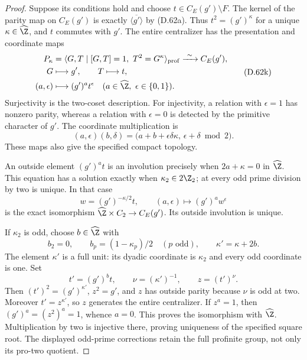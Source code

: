 \begin{proof}
Suppose its conditions hold and choose
$t\in C_E(g')\setminus F$.
The kernel of the parity map on $C_E(g')$ is exactly
$\overline{\langle g'\rangle}$ by (D.62a).
Thus $t^2=(g')^\kappa$ for a unique
$\kappa\in\widehat\Z$, and $t$ commutes with $g'$.
The entire centralizer has the presentation and
coordinate maps
\[
 \begin{split}
 P_\kappa&=
 \langle G,T\mid [G,T]=1,\ T^2=G^\kappa\rangle_{\rm prof}
          \xrightarrow{\ \sim\ } C_E(g'),\\
 G&\longmapsto g',\qquad T\longmapsto t,\\
 (a,\epsilon)&\longmapsto (g')^a t^\epsilon
       \quad(a\in\widehat\Z,\ \epsilon\in\{0,1\}).
 \end{split}                                           \tag{D.62k}
\]
Surjectivity is the two-coset description.
For injectivity, a relation with $\epsilon=1$
has nonzero parity, whereas a relation with
$\epsilon=0$ is detected by the primitive character
of $g'$. The coordinate multiplication is
\[
 (a,\epsilon)(b,\delta)=
 \bigl(a+b+\epsilon\delta\kappa,\,
                       \epsilon+\delta\bmod2\bigr).
                                                        \tag{D.62l}
\]
These maps also give the specified compact topology.

An outside element $(g')^a t$ is an involution
precisely when $2a+\kappa=0$ in $\widehat\Z$.
This equation has a solution exactly when
$\kappa_2\in2\Z_2$; at every odd prime division
by two is unique. In that case
\[
       w=(g')^{-\kappa/2}t,\qquad
       (a,\epsilon)\longmapsto(g')^a w^\epsilon
\]
is the exact isomorphism
$\widehat\Z\times C_2\to C_E(g')$.
Its outside involution is unique.

If $\kappa_2$ is odd, choose $b\in\widehat\Z$ with
\[
 b_2=0,\qquad
 b_p=(1-\kappa_p)/2\quad(p\text{ odd}),
 \qquad \kappa'=\kappa+2b.
                                                        \tag{D.62m}
\]
The element $\kappa'$ is a full unit: its dyadic
coordinate is $\kappa_2$ and every odd coordinate
is one. Set
\[
 t'=(g')^b t,\qquad
 \nu=(\kappa')^{-1},\qquad z=(t')^\nu.
                                                        \tag{D.62n}
\]
Then $(t')^2=(g')^{\kappa'}$, $z^2=g'$, and $z$
has outside parity because $\nu$ is odd at two.
Moreover $t'=z^{\kappa'}$, so $z$ generates the
entire centralizer. If $z^a=1$, then
$(g')^a=(z^2)^a=1$, whence $a=0$.
This proves the isomorphism with $\widehat\Z$.
Multiplication by two is injective there, proving
uniqueness of the specified square root.
The displayed odd-prime corrections retain the
full profinite group, not only its pro-two quotient.


\end{proof}

